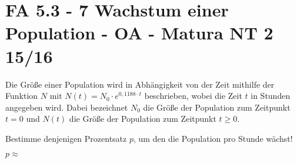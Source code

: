 \section{FA 5.3 - 7 Wachstum einer Population - OA - Matura NT 2 15/16}

\begin{beispiel}[FA 5.3]{1} %
Die Größe einer Population wird in Abhängigkeit von der Zeit mithilfe der Funktion $N$ mit $N(t)=N_0\cdot e^{0,1188\cdot t}$ beschrieben, wobei die Zeit $t$ in Stunden angegeben wird. Dabei bezeichnet $N_0$ die Größe der Population zum Zeitpunkt $t=0$ und $N(t)$ die Größe der Population zum Zeitpunkt $t\geq 0$.

Bestimme denjenigen Prozentsatz $p$, um den die Population pro Stunde wächst!\leer

$p\approx$ 
\end{beispiel}